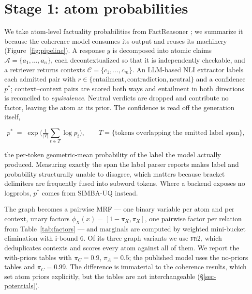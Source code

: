 \documentclass{article} %
\begin{document}
\section{Stage 1: atom probabilities}
\label{sec-factuality}



We take atom-level factuality probabilities from FactReasoner \citep{factreasoner}; we summarize
it because the coherence model consumes its output and reuses its machinery
(Figure~\ref{fig:pipeline}). A response $y$ is decomposed into atomic claims
$\mathcal{A}=\{a_1,\dots,a_n\}$, each decontextualized so that it is independently checkable, and
a retriever returns contexts $\mathcal{C}=\{c_1,\dots,c_m\}$. An LLM-based NLI extractor labels
each admitted pair with $r\in\{\text{entailment},\text{contradiction},\text{neutral}\}$ and a
confidence $p^\ast$; context--context pairs are scored both ways and entailment in both
directions is reconciled to \emph{equivalence}. Neutral verdicts are dropped and contribute no
factor, leaving the atom at its prior. The confidence is read off the generation itself,

\begin{equation}
p^\ast \;=\; \exp\!\Big(\tfrac{1}{|T|}\textstyle\sum_{t\in T}\log p_t\Big),
\qquad T=\{\text{tokens overlapping the emitted label span}\},
\label{eq-pstar}
\end{equation}

the per-token geometric-mean probability of the label the model actually produced. Measuring
exactly the span the label parser reports makes label and probability structurally unable to
disagree, which matters because bracket delimiters are frequently fused into subword tokens.
Where a backend exposes no logprobs, $p^\ast$ comes from SIMBA-UQ \citep{simbauq} instead.

The graph becomes a pairwise MRF --- one binary variable per atom and per context, unary factors
$\phi_X(x)=[1-\pi_X,\pi_X]$, one pairwise factor per relation from Table~\ref{tab:factors} ---
and marginals are computed by weighted mini-bucket elimination \citep{wmb} with i-bound $6$. Of
its three graph variants we use \textsc{fr2}, which deduplicates contexts and scores every atom
against all of them. We report the with-priors tables with $\pi_C=0.9$, $\pi_A=0.5$; the
published model uses the no-priors tables and $\pi_C=0.99$. The difference is immaterial to the
coherence results, which set atom priors explicitly, but the tables are not interchangeable
(\S\ref{sec-potentials}).
\end{document}

